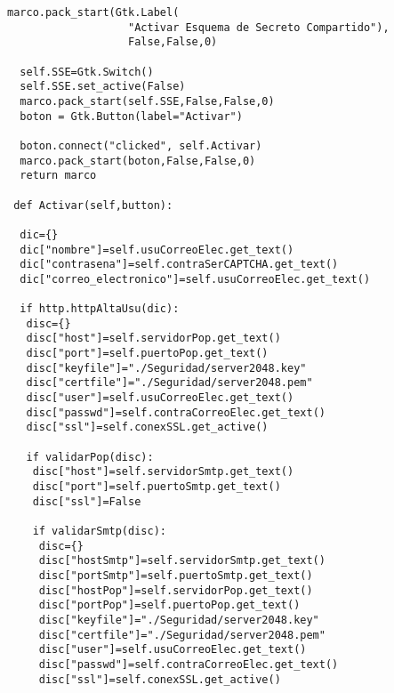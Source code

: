\begin{lstlisting}[frame=single]
  marco.pack_start(Gtk.Label(
                   "Activar Esquema de Secreto Compartido"),
                   False,False,0)
                             
  self.SSE=Gtk.Switch()
  self.SSE.set_active(False)
  marco.pack_start(self.SSE,False,False,0)
  boton = Gtk.Button(label="Activar")
  
  boton.connect("clicked", self.Activar)
  marco.pack_start(boton,False,False,0)
  return marco
  
 def Activar(self,button):
 
  dic={}
  dic["nombre"]=self.usuCorreoElec.get_text()
  dic["contrasena"]=self.contraSerCAPTCHA.get_text()
  dic["correo_electronico"]=self.usuCorreoElec.get_text()
  
  if http.httpAltaUsu(dic):
   disc={}
   disc["host"]=self.servidorPop.get_text()
   disc["port"]=self.puertoPop.get_text()
   disc["keyfile"]="./Seguridad/server2048.key"
   disc["certfile"]="./Seguridad/server2048.pem"
   disc["user"]=self.usuCorreoElec.get_text()
   disc["passwd"]=self.contraCorreoElec.get_text()
   disc["ssl"]=self.conexSSL.get_active()
   
   if validarPop(disc):
    disc["host"]=self.servidorSmtp.get_text()
    disc["port"]=self.puertoSmtp.get_text()
    disc["ssl"]=False
    
    if validarSmtp(disc):
     disc={}
     disc["hostSmtp"]=self.servidorSmtp.get_text()
     disc["portSmtp"]=self.puertoSmtp.get_text()
     disc["hostPop"]=self.servidorPop.get_text()
     disc["portPop"]=self.puertoPop.get_text()
     disc["keyfile"]="./Seguridad/server2048.key"
     disc["certfile"]="./Seguridad/server2048.pem"
     disc["user"]=self.usuCorreoElec.get_text()
     disc["passwd"]=self.contraCorreoElec.get_text()
     disc["ssl"]=self.conexSSL.get_active()
\end{lstlisting}
